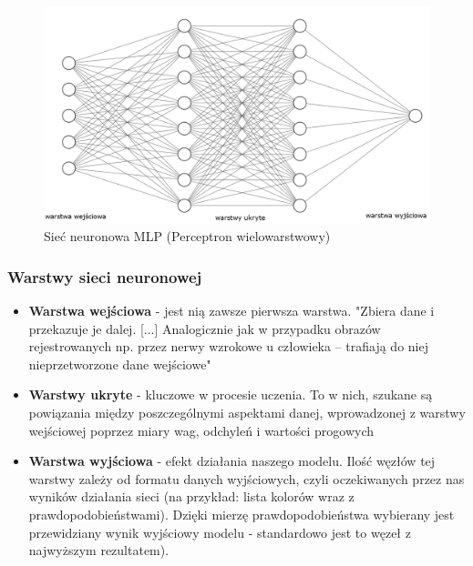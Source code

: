 \pagebreak

\begin{figure}[h!]
    \begin{center}
        \includegraphics[scale=0.52]{img/nn.png}        
    \end{center}
    \caption{Sieć neuronowa MLP (Perceptron wielowarstwowy)\protect\footnotemark}
    \label{fig:sieć neuronowa}
\end{figure}


\subsubsection{Warstwy sieci neuronowej}
\begin{itemize}
    \label{itm:warstwy}
    \item \textbf{Warstwa wejściowa} - jest nią zawsze pierwsza warstwa. 
    "\null{}Zbiera dane i przekazuje je dalej. [...] Analogicznie jak w przypadku obrazów rejestrowanych np. przez nerwy wzrokowe u człowieka – trafiają do niej nieprzetworzone dane wejściowe" \cite{sztucznainteligencja}
    \item \textbf{Warstwy ukryte} - kluczowe w procesie uczenia. To w nich, szukane są powiązania między poszczególnymi aspektami danej, wprowadzonej z warstwy wejściowej poprzez miary wag, odchyleń i wartości progowych
    \item \textbf{Warstwa wyjściowa} - efekt działania naszego modelu. Ilość węzłów tej warstwy zależy od formatu danych wyjściowych, czyli oczekiwanych przez nas wyników działania sieci (na przykład: lista kolorów wraz z prawdopodobieństwami). Dzięki mierzę prawdopodobieństwa wybierany jest przewidziany wynik wyjściowy modelu - standardowo jest to węzeł z najwyższym rezultatem).
\end{itemize}

